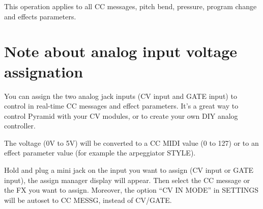 This operation applies to all CC messages, pitch bend, pressure, program change and effects parameters.


\section{Note about analog input voltage assignation}

You can assign the two analog jack inputs (CV input and GATE input) to control in real-time CC messages and effect parameters. It's a great way to control Pyramid with your CV modules, or to create your own DIY analog controller.

The voltage (0V to 5V) will be converted to a CC MIDI value (0 to 127) or to an effect parameter value (for example the arpeggiator STYLE).

Hold  and plug a mini jack on the input you want to assign (CV input or GATE input), the assign manager display will appear. Then select the CC message or the FX you want to assign. Moreover, the option ``CV IN MODE'' in SETTINGS will be autoset to CC MESSG, instead of CV/GATE.

